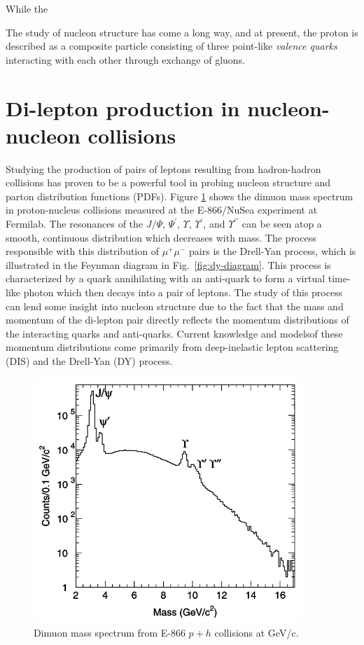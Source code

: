 While the 

The study of nucleon structure has come a long way, and at present, the proton 
is described as a composite particle consisting of three point-like \emph{valence quarks}
interacting with each other through exchange of gluons.

\section{Di-lepton production in nucleon-nucleon collisions}

Studying the production of pairs of leptons resulting from hadron-hadron collisions has proven to be a powerful tool in probing nucleon structure and parton distribution functions (PDFs). Figure \ref{fig:DY-spectrum} shows the dimuon mass spectrum in proton-nucleus collisions measured at the E-866/NuSea experiment at Fermilab\cite{PhysRevLett.80.3715}. The resonances of the $J/\Psi$, $\Psi^\prime$, $\Upsilon$, $\Upsilon^\prime$, and $\Upsilon^{\prime\prime}$ can be seen atop a smooth, continuous distribution which decreases with mass. The process responsible with this distribution of $\mu^+\mu^-$ pairs is the Drell-Yan process\cite{PhysRevLett.25.316}, which is illustrated in the Feynman diagram in Fig.~\ref{fig:dy-diagram}. This process is characterized by a quark annihilating with an anti-quark to form a virtual time-like photon which then decays into a pair of leptons. The study of this process can lend some insight into nucleon structure due to the fact that the mass and momentum of the di-lepton pair directly reflects the momentum distributions of the interacting quarks and anti-quarks. Current knowledge and models\CN of these momentum distributions come primarily from deep-inelastic lepton scattering (DIS) and the Drell-Yan (DY) process.

\begin{figure}
	\centering
	\includegraphics[width=4in]{figures/background/DY-spectrum-e866.png}
	\caption{Dimuon mass spectrum from E-866 $p+h$ collisions at \unit[800]{GeV/c}\cite{PhysRevLett.80.3715}.}
	\label{fig:DY-spectrum}
\end{figure}

